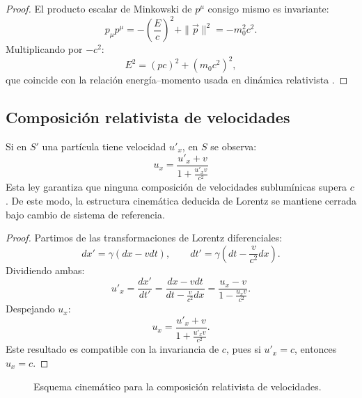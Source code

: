 \documentclass[12pt, a4paper]{article}
\theoremstyle{plain}
\theoremstyle{definition}
\theoremstyle{remark}
\newcommand{\ve}[1]{\vec{#1}}
\begin{document}
\begin{proof}
El producto escalar de Minkowski de $p^\mu$ consigo mismo es invariante:
\begin{equation}
  p_\mu p^\mu
  =-\left(\frac{E}{c}\right)^2+\|\ve{p}\|^2
  =-m_0^2c^2.
\end{equation}
Multiplicando por $-c^2$:
\begin{equation}
  E^2=(pc)^2+(m_0c^2)^2,
\end{equation}
que coincide con la relación energía--momento usada en dinámica relativista
\cite{mit8033_l7,mit8033_notes}.
\end{proof}

\subsection{Composición relativista de velocidades}

Si en $S'$ una partícula tiene velocidad $u'_x$, en $S$ se observa:
\begin{equation}
  u_x=\frac{u'_x+v}{1+\frac{u'_x v}{c^2}}
\end{equation}
Esta ley garantiza que ninguna composición de velocidades sublumínicas supera $c$.
De este modo, la estructura cinemática deducida de Lorentz se mantiene cerrada bajo cambio
de sistema de referencia.

\begin{proof}
Partimos de las transformaciones de Lorentz diferenciales:
\begin{equation}
  dx'=\gamma(dx-vdt),\qquad
  dt'=\gamma\left(dt-\frac{v}{c^2}dx\right).
\end{equation}
Dividiendo ambas:
\begin{equation}
  u'_x=\frac{dx'}{dt'}=\frac{dx-vdt}{dt-\frac{v}{c^2}dx}
      =\frac{u_x-v}{1-\frac{u_xv}{c^2}}.
\end{equation}
Despejando $u_x$:
\begin{equation}
  u_x=\frac{u'_x+v}{1+\frac{u'_xv}{c^2}}.
\end{equation}
Este resultado es compatible con la invariancia de $c$, pues si $u'_x=c$, entonces $u_x=c$.
\end{proof}

\begin{figure}[H]
  \centering
  \caption{Esquema cinemático para la composición relativista de velocidades.}
\end{figure}
\end{document}
